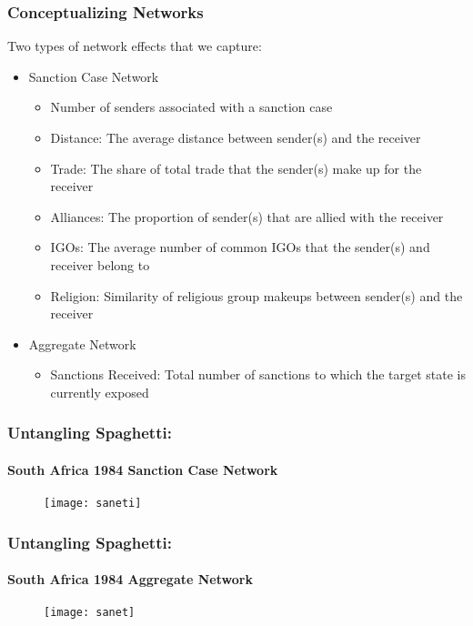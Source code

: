\begin{frame}
\frametitle{Conceptualizing Networks}

Two types of network effects that we capture:

\begin{itemize}
	\item Sanction Case Network
	\begin{itemize}
		\item Number of senders associated with a sanction case
		\item Distance: The average distance between sender(s) and the receiver
		\item Trade: The share of total trade that the sender(s) make up for the receiver		
		\item Alliances: The proportion of sender(s) that are allied with the receiver
		\item IGOs: The average number of common IGOs that the sender(s) and receiver belong to
		\item Religion: Similarity of religious group makeups between sender(s) and the receiver
	\end{itemize}
	\item Aggregate Network
	\begin{itemize}
		\item Sanctions Received: Total number of sanctions to which the target state is currently exposed
	\end{itemize}
\end{itemize}

\end{frame}

\begin{frame}
\frametitle{Untangling Spaghetti:}
\framesubtitle{South Africa 1984 Sanction Case Network}

\vspace{-.4cm}
\begin{figure}[ht]
	\centering
	\texttt{[image: saneti]}
\end{figure}

\end{frame}

\begin{frame}
\frametitle{Untangling Spaghetti:}
\framesubtitle{South Africa 1984 Aggregate Network}

\begin{figure}[ht]
	\centering
	\texttt{[image: sanet]}
\end{figure}

\end{frame}

